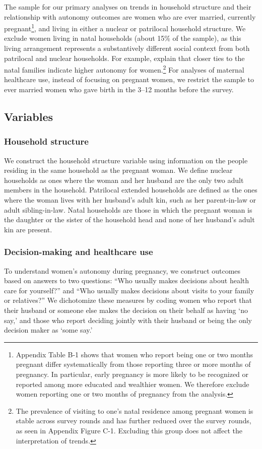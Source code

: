 \documentclass[10pt,twoside,reqno]{article}
\begin{document}
The sample for our primary analyses on trends in household structure and their relationship with autonomy outcomes are women who are ever married, currently pregnant\footnote{Appendix Table B-1 shows that women who report being one or two months pregnant differ systematically from those reporting three or more months of pregnancy. In particular, early pregnancy is more likely to be recognized or reported among more educated and wealthier women. We therefore exclude women reporting one or two months of pregnancy from the analysis.}, and living in either a nuclear or patrilocal household structure. We exclude women living in natal households (about 15\% of the sample), as this living arrangement represents a substantively different social context from both patrilocal and nuclear households. For example, \cite{dyson1983kinship} explain that closer ties to the natal families indicate higher autonomy for women.\footnote{The prevalence of visiting to one's natal residence among pregnant women is stable across survey rounds and has further reduced over the survey rounds, as seen in Appendix Figure C-1.  Excluding this group does not affect the interpretation of trends.} For analyses of maternal healthcare use, instead of focusing on pregnant women, we restrict the sample to ever married women who gave birth in the 3--12 months before the survey.

\subsection*{Variables}

\subsubsection*{Household structure} \label{sec:def_hhstruc}
We construct the household structure variable using information on the people residing in the same household as the pregnant woman. We define nuclear households as ones where the woman and her husband are the only two adult members in the household. Patrilocal extended households are defined as the ones where the woman lives with her husband’s adult kin, such as her parent-in-law or adult sibling-in-law. Natal households are those in which the pregnant woman is the daughter or the sister of the household head and none of her husband’s adult kin are present. 

\subsubsection*{Decision-making and healthcare use} \label{sec:outcomes}
To understand women's autonomy during pregnancy, we construct outcomes based on answers to two questions: ``Who usually makes decisions about health care for yourself?'' and ``Who usually makes decisions about visits to your family or relatives?'' We dichotomize these measures by coding women who report that their husband or someone else makes the decision on their behalf as having ‘no say,’ and those who report deciding jointly with their husband or being the only decision maker as ‘some say.’
\end{document}
